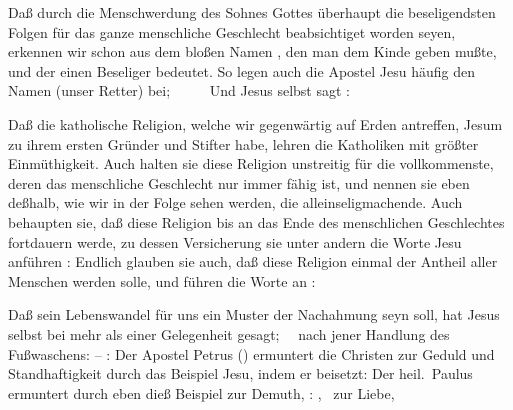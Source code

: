 Daß durch die Menschwerdung des Sohnes Gottes überhaupt die beseligendsten Folgen für das ganze menschliche Geschlecht beabsichtiget worden seyen, erkennen wir schon aus dem bloßen Namen , den man dem Kinde geben mußte, und der einen Beseliger bedeutet. So legen auch die Apostel Jesu häufig den Namen  (unser Retter) bei; \zB\ \ \ \ \uma\  Und Jesus selbst sagt : 
\begin{aufza}
\item Daß die katholische Religion, welche wir gegenwärtig auf Erden antreffen, Jesum zu ihrem ersten Gründer und Stifter habe, lehren die Katholiken mit größter Einmüthigkeit. Auch halten sie diese Religion unstreitig für die vollkommenste, deren das menschliche Geschlecht nur immer fähig ist, und nennen sie eben deßhalb, wie wir in der Folge sehen werden, die alleinseligmachende. Auch behaupten sie, daß diese Religion bis an das Ende des menschlichen Geschlechtes fortdauern werde, zu dessen Versicherung sie unter andern die Worte Jesu anführen :  Endlich glauben sie auch, daß diese Religion einmal der Antheil aller Menschen werden solle, und führen die Worte an : 
\item Daß sein Lebenswandel für uns ein Muster der Nachahmung seyn soll, hat Jesus selbst bei mehr als einer Gelegenheit gesagt; \zB\ \ nach jener Handlung des Fußwaschens:  -- :  Der Apostel Petrus () ermuntert die Christen zur Geduld und Standhaftigkeit durch das Beispiel Jesu, indem er beisetzt:  Der heil.\ Paulus ermuntert durch eben dieß Beispiel zur Demuth, : , \ zur Liebe, \usw\

\end{aufza}
